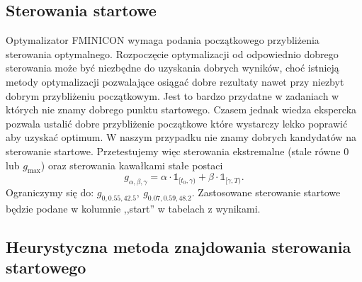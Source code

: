 \documentclass[licencjacka]{pracamgr}
\def\1{\mathds{1}}
\begin{document}
\subsection{Sterowania startowe}\label{start_control}
Optymalizator FMINICON wymaga podania początkowego przybliżenia sterowania optymalnego. Rozpoczęcie optymalizacji od odpowiednio dobrego sterowania może być niezbędne do uzyskania dobrych wyników, choć istnieją metody optymalizacji pozwalające osiągać dobre rezultaty nawet przy niezbyt dobrym przybliżeniu początkowym. Jest to bardzo przydatne w zadaniach w których nie znamy dobrego punktu startowego. Czasem jednak wiedza ekspercka pozwala ustalić dobre przybliżenie początkowe które wystarczy lekko poprawić aby uzyskać optimum. W naszym przypadku nie znamy dobrych kandydatów na sterowanie startowe. Przetestujemy więc sterowania ekstremalne (stale równe 0 lub $g_{\max}$) oraz sterowania kawałkami stałe postaci
\begin{equation}\label{start-parametrization}
  g_{\alpha,\beta,\gamma} = \alpha \cdot \1_{[t_0, \gamma)} + \beta \cdot \1_{[\gamma, T)}.
\end{equation}
Ograniczymy się do: $g_{0,0.55,42.5},\ g_{0.07,0.59,48.2}$. Zastosowane sterowanie startowe będzie podane w kolumnie ,,start'' w tabelach z wynikami.

\subsection{Heurystyczna metoda znajdowania sterowania startowego}\label{start_method}
\end{document}
